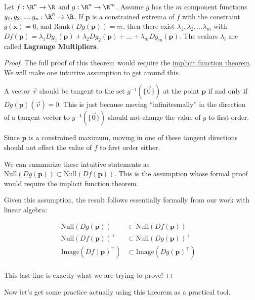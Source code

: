 \documentclass{ximera}
\begin{document}
	\begin{theorem}
		Let $f:\R^n \to \R$ and $g:\R^n \to \R^m$. Assume $g$ has the $m$ component functions $g_1,g_2,...,g_n:\R^n \to \R$. If $\mathbf{p}$ is a constrained extrema of $f$ with the constraint $g(\mathbf{x}) = 0$, 
		and $\textrm{Rank}(Dg(\mathbf{p})) = m$, then there exist $\lambda_1,\lambda_2,...\lambda_m$ with 
		$Df(\mathbf{p}) = \lambda_1Dg_1(\mathbf{p})+ \lambda_2Dg_2(\mathbf{p})+...+\lambda_mDg_m(\mathbf{p})$.  The scalars $\lambda_i$ are
		called \textbf{Lagrange Multipliers}.
	\end{theorem}
	
	\begin{proof}
			The full proof of this theorem would require the \href{http://en.wikipedia.org/wiki/Implicit_function_theorem}{implicit function theorem}.  We will 
			make one intuitive assumption to get around this.
			
			A vector  $\vec{v}$ should be  tangent to the set $g^{-1}(\{\vec{0}\})$ at the point $\mathbf{p}$  if and only if 
			$Dg(\mathbf{p})(\vec{v}) = 0$.  This is just because moving ``infinitesmally'' in the direction of a tangent vector to 
			$g^{-1}(\{\vec{0}\})$ should not change the value of $g$ to first order.  
			
			Since $\mathbf{p}$ is a constrained maximum, moving in one of these tangent directions should not effect the value of $f$ to first order either.
			
			We can summarize these intuitive statements as $\textrm{Null}(Dg(\mathbf{p})) \subset \textrm{Null}(Df(\mathbf{p}))$.  This is the assumption whose
			formal proof would require the implicit function theorem.
			
			Given this assumption, the result follows essentially formally from our work with linear algebra:
			
			\begin{align*}
				\textrm{Null}(Dg(\mathbf{p})) &\subset \textrm{Null}(Df(\mathbf{p}))\\
				\textrm{Null}(Df(\mathbf{p}))^\perp &\subset \textrm{Null}(Dg(\mathbf{p}))^\perp\\
				\textrm{Image}(Df(\mathbf{p})^\top) &\subset \textrm{Image}(Dg(\mathbf{p})^\top)\\
			\end{align*}
			
			This last line is exactly what we are trying to prove!
		\end{proof}
		
	Now let's get some practice actually using this theorem as a practical tool.
	
\end{document}
